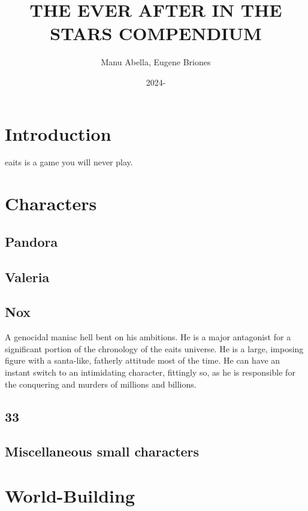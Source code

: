 \documentclass[12pt, titlepage]{article}
\title{THE EVER AFTER IN THE STARS COMPENDIUM}
\author{Manu Abella, Eugene Briones}
\date{2024-}
\begin{document}
\maketitle


\tableofcontents
\newpage

\section{Introduction}

\gls{eaits} is a game you will never play. 

\section{Characters}

\subsection{Pandora}

\subsection{Valeria}

\subsection{Nox}

A genocidal maniac hell bent on his ambitions. He is a major antagonist for a significant portion of the chronology of the \gls{eaits} universe. He is a large, imposing figure with a santa-like, fatherly attitude most of the time. He can have an instant switch to an intimidating character, fittingly so, as he is responsible for the conquering and murders of millions and billions. 

\subsection{33}

\subsection{Miscellaneous small characters}

\section{World-Building}
\end{document}

